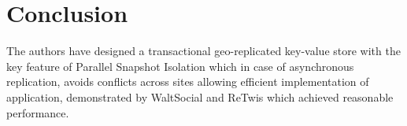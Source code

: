 \documentclass[a4paper]{article}
\begin{document}

\section{Conclusion}

The authors have designed a transactional geo-replicated key-value store with the key feature of Parallel Snapshot Isolation which in case of asynchronous replication, avoids conflicts across sites allowing efficient implementation of application, demonstrated by WaltSocial and ReTwis which achieved reasonable performance.  
\end{document}
